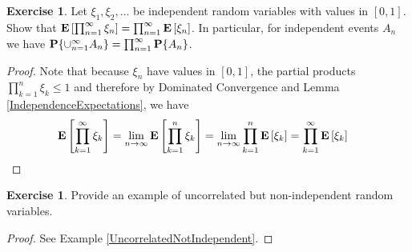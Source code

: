 \documentclass{amsart}
\theoremstyle{remark}
\theoremstyle{definition}
\newtheorem{ex}[thm]{Exercise}
\begin{document}
\begin{ex}Let $\xi_1, \xi_2, \dots$ be independent random variables with values in
  $[0,1]$.  Show that $\textbf{E}\left[\prod_{n =1}^\infty \xi_n\right] =
  \prod_{n=1}^\infty \textbf{E}\left[\xi_n\right]$.  In particular, for
  independent events $A_n$ we have $\textbf{P}\{\cup_{n=1}^\infty
    A_n\} = \prod_{n=1}^\infty \textbf{P}\{A_n\}$.
\end{ex}
\begin{proof}
Note that because $\xi_n$ have values in $[0,1]$, the partial products
$\prod_{k=1}^n \xi_k \leq 1$ and therefore by Dominated Convergence
and Lemma \ref{IndependenceExpectations}, we have
\begin{align*}
\textbf{E}\left[\prod_{k =1}^\infty \xi_k\right] &= \lim_{n \to \infty}
\textbf{E}\left[\prod_{k=1}^n \xi_k\right] = \lim_{n \to \infty}
\prod_{k=1}^n\textbf{E}\left[ \xi_k\right] = \prod_{k=1}^\infty \textbf{E}\left[ \xi_k\right] 
\end{align*}
\end{proof}

\begin{ex}Provide an example of uncorrelated but non-independent
  random variables.
\end{ex}
\begin{proof}See Example \ref{UncorrelatedNotIndependent}.
\end{proof}
\end{document}
